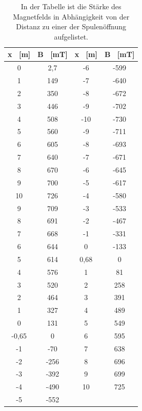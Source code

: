 \documentclass[titlepage = firstcover]{scrartcl}
\begin{document}
        \begin{table}[h]
            \centering 
            \caption{In der Tabelle ist die Stärke des Magnetfelds in Abhängigkeit von der Distanz zu einer der Spulenöffnung aufgelistet.}
            \label{tab:Hysterese}

            \begin{tabular}{c c c c}
                \toprule
                {x \ [m]} & {B \ [mT]} & {x \ [m]} & {B \ [mT]} \\
                \midrule
                0 & 2,7   & -6   & -599 \\
                1 & 149   & -7   & -640 \\
                2 & 350   & -8   & -672 \\
                3 & 446   & -9   & -702 \\
                4 & 508   & -10  & -730 \\
                5 & 560   & -9   & -711 \\
                6 & 605   & -8   & -693 \\
                7 & 640   & -7   & -671 \\
                8 & 670   & -6   & -645 \\
                9 & 700   & -5   & -617 \\
                10 & 726  & -4   & -580 \\
                9 & 709   & -3   & -533 \\
                8 & 691   & -2   & -467 \\
                7 & 668   & -1   & -331 \\
                6 & 644   &  0   & -133 \\
                5 & 614   & 0,68 &    0 \\
                4 & 576   & 1    &   81 \\
                3 & 520   & 2    &  258 \\
                2 & 464   & 3    &  391 \\
                1 & 327   & 4    &  489 \\
                0 & 131   & 5    &  549 \\
                -0,65 & 0 & 6    &  595 \\
                -1 & -70  & 7    &  638 \\
                -2 & -256 & 8    &  696 \\
                -3 & -392 & 9    &  699 \\
                -4 & -490 & 10   &  725 \\
                -5 & -552 & & \\
                \bottomrule
            \end{tabular}                
        \end{table}
\end{document}
